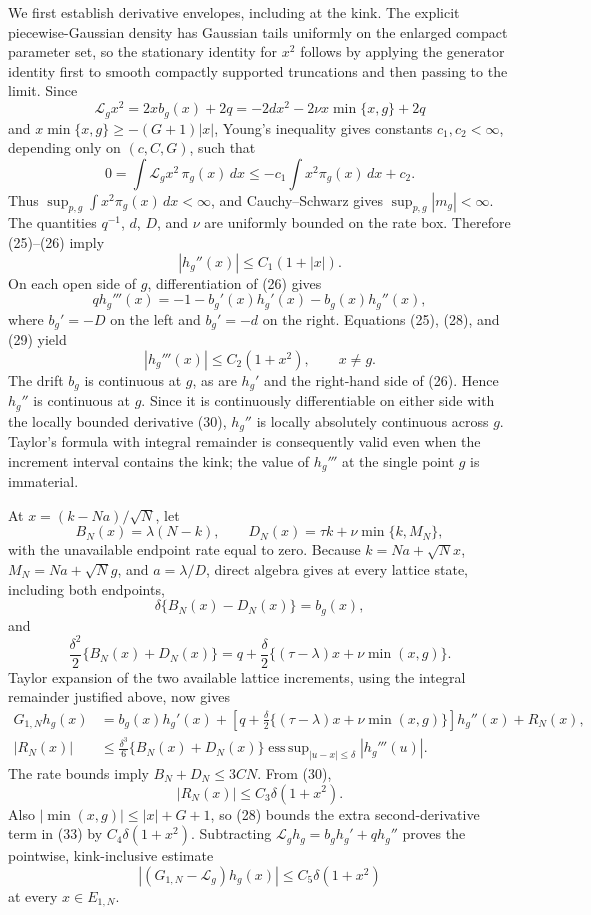 We first establish derivative envelopes, including at the kink.  The explicit piecewise-Gaussian density has Gaussian tails uniformly on the enlarged compact parameter set, so the stationary identity for \(x^2\) follows by applying the generator identity first to smooth compactly supported truncations and then passing to the limit.  Since
\[
 \mathcal L_gx^2=2xb_g(x)+2q
 =-2dx^2-2\nu x\min\{x,g\}+2q
\]
and
\(x\min\{x,g\}\geq-(G+1)|x|\), Young's inequality gives constants \(c_1,c_2<\infty\), depending only on \((c,C,G)\), such that
\[
 0=\int\mathcal L_gx^2\,\pi_g(x)\,dx
 \leq-c_1\int x^2\pi_g(x)\,dx+c_2.                            \tag{27}
\]
Thus \(\sup_{p,g}\int x^2\pi_g(x)\,dx<\infty\), and Cauchy--Schwarz gives \(\sup_{p,g}|m_g|<\infty\).  The quantities \(q^{-1}\), \(d\), \(D\), and \(\nu\) are uniformly bounded on the rate box.  Therefore (25)--(26) imply
\[
 |h_g''(x)|\leq C_1(1+|x|).                                    \tag{28}
\]
On each open side of \(g\), differentiation of (26) gives
\[
 qh_g'''(x)=-1-b_g'(x)h_g'(x)-b_g(x)h_g''(x),                  \tag{29}
\]
where \(b_g'=-D\) on the left and \(b_g'=-d\) on the right.  Equations (25), (28), and (29) yield
\[
 |h_g'''(x)|\leq C_2(1+x^2),\qquad x\neq g.                    \tag{30}
\]
The drift \(b_g\) is continuous at \(g\), as are \(h_g'\) and the right-hand side of (26).  Hence \(h_g''\) is continuous at \(g\).  Since it is continuously differentiable on either side with the locally bounded derivative (30), \(h_g''\) is locally absolutely continuous across \(g\).  Taylor's formula with integral remainder is consequently valid even when the increment interval contains the kink; the value of \(h_g'''\) at the single point \(g\) is immaterial.

At \(x=(k-Na)/\sqrt N\), let
\[
 B_N(x)=\lambda(N-k),
 \qquad D_N(x)=\tau k+\nu\min\{k,M_N\},
\]
with the unavailable endpoint rate equal to zero.  Because
\(k=Na+\sqrt N x\), \(M_N=Na+\sqrt N g\), and \(a=\lambda/D\), direct algebra gives at every lattice state, including both endpoints,
\[
 \delta\{B_N(x)-D_N(x)\}=b_g(x),                               \tag{31}
\]
and
\[
 \frac{\delta^2}{2}\{B_N(x)+D_N(x)\}
 =q+\frac\delta2\{(\tau-\lambda)x+\nu\min(x,g)\}.             \tag{32}
\]
Taylor expansion of the two available lattice increments, using the integral remainder justified above, now gives
\[
 \begin{split}
 G_{1,N}h_g(x)
 &=b_g(x)h_g'(x)
 +\left[q+\frac\delta2\{(\tau-\lambda)x+\nu\min(x,g)\}\right]h_g''(x)
 +R_N(x),\\
 |R_N(x)|
 &\leq\frac{\delta^3}{6}\{B_N(x)+D_N(x)\}
 \mathop{\operatorname{ess\,sup}}_{|u-x|\leq\delta}|h_g'''(u)|.
 \end{split}                                                     \tag{33}
\]
The rate bounds imply \(B_N+D_N\leq3CN\).  From (30),
\[
 |R_N(x)|\leq C_3\delta(1+x^2).                                \tag{34}
\]
Also \(|\min(x,g)|\leq |x|+G+1\), so (28) bounds the extra second-derivative term in (33) by \(C_4\delta(1+x^2)\).  Subtracting
\(\mathcal L_gh_g=b_gh_g'+qh_g''\) proves the pointwise, kink-inclusive estimate
\[
 |(G_{1,N}-\mathcal L_g)h_g(x)|
 \leq C_5\delta(1+x^2)                                         \tag{35}
\]
at every \(x\in E_{1,N}\).


